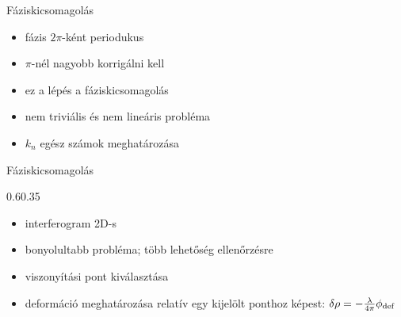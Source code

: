 \def\ft{Fáziskicsomagolás}

\begin{frame}{\ft}
    \begin{minipage}[c]{0.475\textwidth}
    \end{minipage}
    \begin{minipage}[c]{0.475\textwidth}
    \end{minipage}
    \vspace{10pt}
    \begin{minipage}[c]{0.475\textwidth}
    \begin{itemize}
        \item fázis $2\pi$-ként periodukus
        \item $\pi$-nél nagyobb  korrigálni kell
        \item ez a lépés a fáziskicsomagolás
        \item nem triviális és nem lineáris probléma
        \item $k_n$ egész számok meghatározása
    \end{itemize}
    \end{minipage}
    \begin{minipage}[c]{0.475\textwidth}
    \end{minipage}
\end{frame}


\begin{frame}{\ft}
    \begin{figp}{}{}{0.6}{0.35}
        \begin{itemize}
            \item interferogram 2D-s
            \item bonyolultabb probléma; több lehetőség ellenőrzésre
            \item viszonyítási pont kiválasztása
            \item deformáció meghatározása relatív egy kijelölt ponthoz képest: $\delta\rho = -\frac{\lambda}{4\pi}\phi_{\text{def}}$
        \end{itemize}
    \end{figp}
\end{frame}
